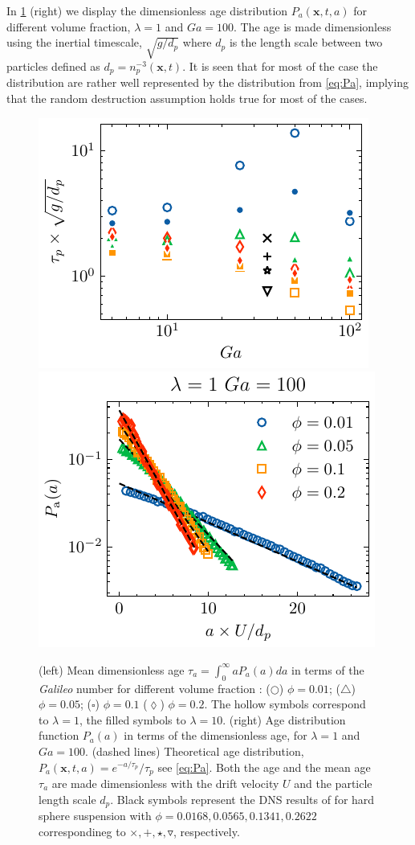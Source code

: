 In \ref{fig:age_picture} (right) we display the dimensionless age distribution $P_a(\textbf{x},t,a)$ for different volume fraction, $\lambda =1$ and $Ga = 100$. 
The age is made dimensionless using the inertial timescale, $\sqrt{g/d_p}$ where $d_p$ is the length scale between two particles defined as $d_p = n_p^{-3}(\textbf{x},t)$. 
It is seen that for most of the case the distribution are rather well represented by the distribution from \ref{eq:Pa}, implying that the random destruction assumption holds true for most of the cases. 
\begin{figure}[h!]
    \centering

    \includegraphics[height = 0.3\textwidth]{image/HOMOGENEOUS_NEW/tau_Ga.pdf}
    \includegraphics[height = 0.3\textwidth]{image/HOMOGENEOUS_NEW/Dist/Pa_l_1_Ga_100.pdf}
    \caption{
    (left) Mean dimensionless age $\tau_a =  \int_0^\infty aP_a(a)da$ in terms of the \textit{Galileo} number for different volume fraction :   
    ($\pmb\bigcirc$) $\phi = 0.01$; ($\pmb\triangle$) $ \phi = 0.05$; ($\pmb\square$) $\phi = 0.1$ ($\pmb\lozenge$) $\phi = 0.2$.
    The hollow symbols correspond to $\lambda = 1$, the filled symbols to $\lambda = 10$.
    (right) Age distribution function $P_a(a)$ in terms of the dimensionless age, for $\lambda = 1$ and  $Ga = 100$.
    (dashed lines) Theoretical age distribution, $P_a(\textbf{x},t, a) =e^{-a/\tau_p}/\tau_p$ see \ref{eq:Pa}. 
    Both the age and the mean age $\tau_a$ are made dimensionless with the drift velocity $U$ and the particle length scale $d_p$.  
    Black symbols represent the DNS results of \citet{zhang2023evolution} for hard sphere suspension with $\phi = 0.0168,0.0565,0.1341,0.2622$ correspondineg to $\pmb\times, \pmb +, \pmb\star , \pmb\triangledown$, respectively.
    }
    \label{fig:age_picture}
\end{figure}
